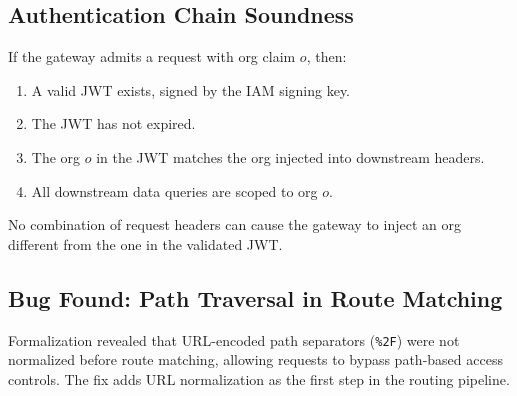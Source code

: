 \subsection{Authentication Chain Soundness}

\begin{theorem}
If the gateway admits a request with org claim $o$, then:
\begin{enumerate}[leftmargin=1.4em]
    \item A valid JWT exists, signed by the IAM signing key.
    \item The JWT has not expired.
    \item The org $o$ in the JWT matches the org injected into downstream
    headers.
    \item All downstream data queries are scoped to org $o$.
\end{enumerate}
No combination of request headers can cause the gateway to inject an org
different from the one in the validated JWT.
\end{theorem}

\subsection{Bug Found: Path Traversal in Route Matching}

Formalization revealed that URL-encoded path separators (\texttt{\%2F}) were
not normalized before route matching, allowing requests to bypass path-based
access controls. The fix adds URL normalization as the first step in the
routing pipeline.

